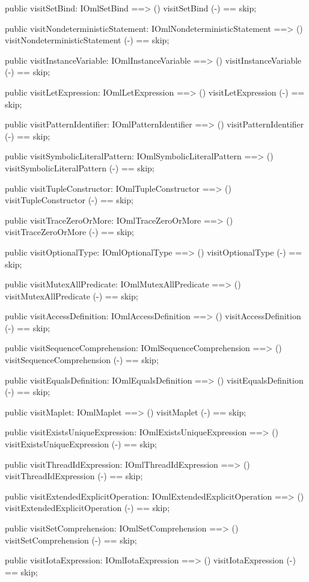 \begin{vdm_al}
  public visitSetBind: IOmlSetBind ==> ()
  visitSetBind (-) == skip;

  public visitNondeterministicStatement: IOmlNondeterministicStatement ==> ()
  visitNondeterministicStatement (-) == skip;

  public visitInstanceVariable: IOmlInstanceVariable ==> ()
  visitInstanceVariable (-) == skip;

  public visitLetExpression: IOmlLetExpression ==> ()
  visitLetExpression (-) == skip;

  public visitPatternIdentifier: IOmlPatternIdentifier ==> ()
  visitPatternIdentifier (-) == skip;

  public visitSymbolicLiteralPattern: IOmlSymbolicLiteralPattern ==> ()
  visitSymbolicLiteralPattern (-) == skip;

  public visitTupleConstructor: IOmlTupleConstructor ==> ()
  visitTupleConstructor (-) == skip;

  public visitTraceZeroOrMore: IOmlTraceZeroOrMore ==> ()
  visitTraceZeroOrMore (-) == skip;

  public visitOptionalType: IOmlOptionalType ==> ()
  visitOptionalType (-) == skip;

  public visitMutexAllPredicate: IOmlMutexAllPredicate ==> ()
  visitMutexAllPredicate (-) == skip;

  public visitAccessDefinition: IOmlAccessDefinition ==> ()
  visitAccessDefinition (-) == skip;

  public visitSequenceComprehension: IOmlSequenceComprehension ==> ()
  visitSequenceComprehension (-) == skip;

  public visitEqualsDefinition: IOmlEqualsDefinition ==> ()
  visitEqualsDefinition (-) == skip;

  public visitMaplet: IOmlMaplet ==> ()
  visitMaplet (-) == skip;

  public visitExistsUniqueExpression: IOmlExistsUniqueExpression ==> ()
  visitExistsUniqueExpression (-) == skip;

  public visitThreadIdExpression: IOmlThreadIdExpression ==> ()
  visitThreadIdExpression (-) == skip;

  public visitExtendedExplicitOperation: IOmlExtendedExplicitOperation ==> ()
  visitExtendedExplicitOperation (-) == skip;

  public visitSetComprehension: IOmlSetComprehension ==> ()
  visitSetComprehension (-) == skip;

  public visitIotaExpression: IOmlIotaExpression ==> ()
  visitIotaExpression (-) == skip;


\end{vdm_al}
